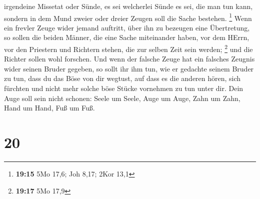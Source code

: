 irgendeine Missetat oder Sünde, es sei welcherlei Sünde es sei, die man
tun kann, sondern in dem Mund zweier oder dreier Zeugen soll die Sache
bestehen. \footnote{\textbf{19:15} 5Mo 17,6; Joh 8,17; 2Kor 13,1}
 Wenn ein frevler Zeuge wider jemand auftritt, über ihn
zu bezeugen eine Übertretung,  so sollen die beiden
Männer, die eine Sache miteinander haben, vor dem HErrn, vor den
Priestern und Richtern stehen, die zur selben Zeit sein werden;
\footnote{\textbf{19:17} 5Mo 17,9}  und die Richter
sollen wohl forschen. Und wenn der falsche Zeuge hat ein falsches
Zeugnis wider seinen Bruder gegeben,  so sollt ihr ihm
tun, wie er gedachte seinem Bruder zu tun, dass du das Böse von dir
wegtust,  auf dass es die anderen hören, sich fürchten
und nicht mehr solche böse Stücke vornehmen zu tun unter dir.
 Dein Auge soll sein nicht schonen: Seele um Seele, Auge
um Auge, Zahn um Zahn, Hand um Hand, Fuß um Fuß.

\hypertarget{section-19}{%
\section{20}\label{section-19}}

